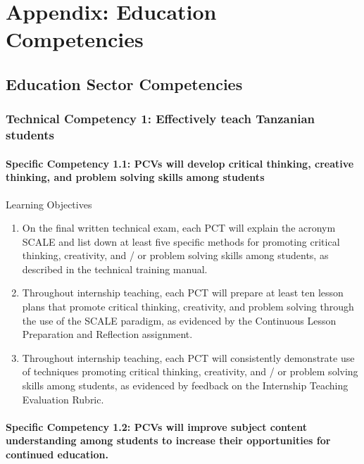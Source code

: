 \chapter{Appendix: Education Competencies}
\section{Education Sector Competencies}
\subsection*{Technical Competency 1: Effectively teach Tanzanian students}

\subsubsection*{Specific Competency 1.1: PCVs will develop critical thinking, creative thinking, and problem solving skills among students}

Learning Objectives
\begin{enumerate}
\item On the final written technical exam, each PCT will explain the acronym SCALE and list down at least five specific methods for promoting critical thinking, creativity, and / or problem solving skills among students, as described in the technical training manual.

\item Throughout internship teaching, each PCT will prepare at least ten
lesson plans that promote critical thinking, creativity, and problem
solving through the use of the SCALE paradigm, as evidenced by the
Continuous Lesson Preparation and Reflection assignment.

\item  Throughout internship teaching, each PCT will consistently demonstrate use of techniques promoting critical thinking, creativity, and /
or problem solving skills among students, as evidenced by feedback on
the Internship Teaching Evaluation Rubric.
\end{enumerate}

\subsubsection*{Specific Competency 1.2: PCVs will improve subject
content understanding among students to increase their
opportunities for continued education.}

